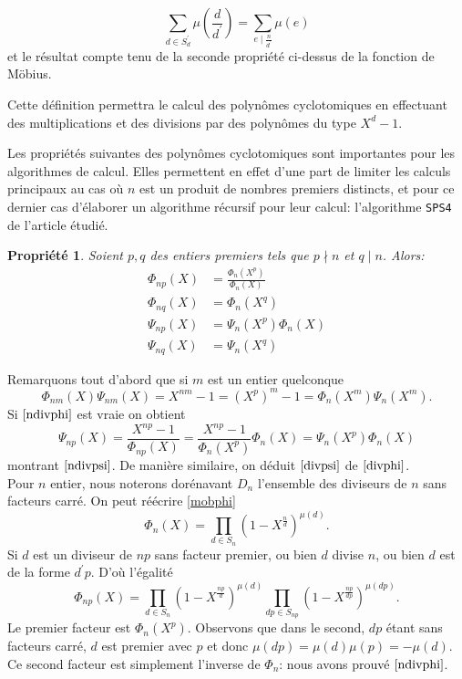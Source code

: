 \documentclass{article}
\theoremstyle{break}                  %
\newtheorem{propriete}{Propriété}
\begin{document}
$$\sum_{d \in S_d^\prime} \mu\left(\frac{d}{d^\prime}\right) = \sum_{e \mid \frac{n}{d^\prime}} \mu(e)$$ et le résultat compte tenu de la seconde propriété ci-dessus de la fonction de Möbius.

Cette définition permettra le calcul des polynômes cyclotomiques en effectuant des multiplications et des divisions par des polynômes du type $X^d - 1$.

Les propriétés suivantes des polynômes cyclotomiques sont importantes pour les algorithmes de calcul. Elles permettent en effet d'une part de limiter les calculs principaux au cas où $n$ est un produit de nombres premiers distincts, et pour ce dernier cas d'élaborer un algorithme récursif pour leur calcul: l'algorithme \texttt{SPS4} de l'article étudié.


\begin{propriete}
	Soient $p,q$ des entiers premiers tels que $p \nmid n$ et $q \mid n$. Alors:
	\begin{align}
		\Phi_{np}(X) &= \frac{\Phi_n(X^p)}{\Phi_n(X)} \tag{2.8a}\label{ndivphi}\\
		\Phi_{nq}(X) &= \Phi_n(X^q) \tag{2.8b}\label{divphi}\\
		\Psi_{np}(X) &= \Psi_n(X^p)\Phi_n(X) \tag{2.8c}\label{ndivpsi}\\
		\Psi_{nq}(X) &= \Psi_n(X^q)	 \tag{2.8d}\label{divpsi}
	\end{align}
\end{propriete}

Remarquons tout d'abord que si $m$ est un entier quelconque
$$\Phi_{nm}(X) \Psi_{nm}(X) = X^{nm}-1 = (X^p)^m-1=\Phi_{n}(X^m) \Psi_{n}(X^m).$$ Si $\ref{ndivphi}$ est vraie on obtient
$$\Psi_{np}(X) = \frac{X^{np}-1}{\Phi_{np}(X)} =\frac{X^{np}-1}{\Phi_{n}(X^p)}\Phi_n(X)=\Psi_n(X^p)\Phi_n(X)$$ montrant $\ref{ndivpsi}$. De manière similaire, on déduit $\ref{divpsi}$ de $\ref{divphi}$.\\

Pour $n$ entier, nous noterons dorénavant $D_n$ l'ensemble des diviseurs de $n$ sans facteurs carré. On peut réécrire \ref{mobphi}
$$\Phi_{n}(X) = \prod_{d \in S_n} (1 - X^\frac{n}{d})^{\mu(d)}.$$ Si $d$ est un diviseur de $np$ sans facteur premier, ou bien $d$ divise $n$, ou bien $d$ est de la forme $d^\prime p$. D'où l'égalité
$$\Phi_{np}(X) = \prod_{d \in S_{n}} (1 - X^\frac{np}{d})^{\mu(d)}
\prod_{dp \in S_{np}} (1 - X^\frac{np}{dp})^{\mu(dp)}.$$ Le premier facteur est $\Phi_{n}(X^p)$. Observons que dans le second, $dp$ étant sans facteurs carré, $d$ est premier avec $p$ et donc $\mu(dp)= \mu(d)\mu(p)= - \mu(d)$. Ce second facteur est simplement l'inverse de $\Phi_{n}$: nous avons prouvé $\ref{ndivphi}$.\\
\end{document}
